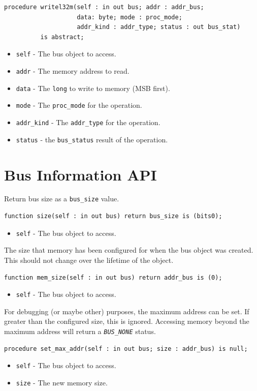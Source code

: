 \documentclass[10pt, openany]{book}
\newcommand{\constant}[1]{\emph{\texttt{#1}}}
\newcommand{\keyword}[1]{\texttt{#1}}
\newcommand{\datatype}[1]{\texttt{#1}}
\begin{document}
\begin{lstlisting}
procedure writel32m(self : in out bus; addr : addr_bus;
                    data: byte; mode : proc_mode;
                    addr_kind : addr_type; status : out bus_stat)
          is abstract;
\end{lstlisting}
\begin{itemize}
  \item \keyword{self} - The bus object to access.
  \item \keyword{addr} - The memory address to read.
  \item \keyword{data} - The \datatype{long} to write to memory (MSB first).
  \item \keyword{mode} - The \datatype{proc\_mode} for the operation.
  \item \keyword{addr\_kind} - The \datatype{addr\_type} for the operation.
  \item \keyword{status} - the \datatype{bus\_status} result of the operation.
\end{itemize}

\section{Bus Information API}

Return bus size as a \datatype{bus\_size} value.
\begin{lstlisting}
function size(self : in out bus) return bus_size is (bits0);
\end{lstlisting}
\begin{itemize}
  \item \keyword{self} - The bus object to access.
\end{itemize}

The size that memory has been configured for when the bus object was created.
This should not change over the lifetime of the object.
\begin{lstlisting}
function mem_size(self : in out bus) return addr_bus is (0);
\end{lstlisting}
\begin{itemize}
  \item \keyword{self} - The bus object to access.
\end{itemize}

For debugging (or maybe other) purposes, the maximum address can be set.
If greater than the configured size, this is ignored.
Accessing memory beyond the maximum address will return a \constant{BUS\_NONE} status.
\begin{lstlisting}
procedure set_max_addr(self : in out bus; size : addr_bus) is null;
\end{lstlisting}
\begin{itemize}
  \item \keyword{self} - The bus object to access.
  \item \keyword{size} - The new memory size.
\end{itemize}
\end{document}
